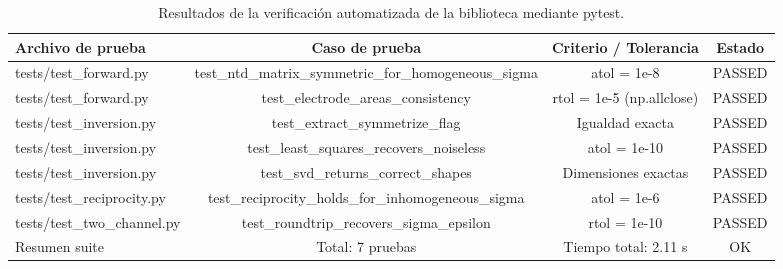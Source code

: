 \begin{table}[htbp]
\centering
\caption{Resultados de la verificación automatizada de la biblioteca mediante pytest.}
\label{tab:pruebas_unitarias}
\begin{tabular}{lccc}
\hline
Archivo de prueba & Caso de prueba & Criterio / Tolerancia & Estado \\
\hline
tests/test\_forward.py & test\_ntd\_matrix\_symmetric\_for\_homogeneous\_sigma & atol = 1e-8 & PASSED \\
tests/test\_forward.py & test\_electrode\_areas\_consistency & rtol = 1e-5 (np.allclose) & PASSED \\
tests/test\_inversion.py & test\_extract\_symmetrize\_flag & Igualdad exacta & PASSED \\
tests/test\_inversion.py & test\_least\_squares\_recovers\_noiseless & atol = 1e-10 & PASSED \\
tests/test\_inversion.py & test\_svd\_returns\_correct\_shapes & Dimensiones exactas & PASSED \\
tests/test\_reciprocity.py & test\_reciprocity\_holds\_for\_inhomogeneous\_sigma & atol = 1e-6 & PASSED \\
tests/test\_two\_channel.py & test\_roundtrip\_recovers\_sigma\_epsilon & rtol = 1e-10 & PASSED \\
Resumen suite & Total: 7 pruebas & Tiempo total: 2.11 s & OK \\
\hline
\end{tabular}
\end{table}
